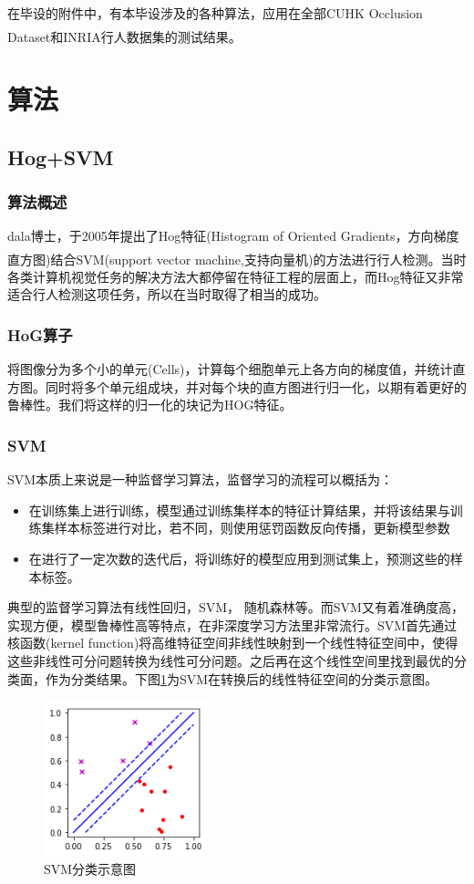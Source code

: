 \documentclass[12pt,a4paper,titlepage]{article}
\newcommand{\upcite}[1]{\textsuperscript{\textsuperscript{\cite{#1}}}}  %
\begin{document}
在毕设的附件中，有本毕设涉及的各种算法，应用在全部CUHK Occlusion Dataset和INRIA\upcite{dalal2005histograms}行人数据集的测试结果。

\section{算法}
\subsection{Hog+SVM}
\subsubsection{算法概述}
dala博士，于2005年提出了Hog特征(Histogram of Oriented Gradients，方向梯度直方图)结合SVM(support vector machine,支持向量机)的方法进行行人检测\upcite{dalal2005histograms}。当时各类计算机视觉任务的解决方法大都停留在特征工程的层面上，而Hog特征又非常适合行人检测这项任务，所以在当时取得了相当的成功。
\subsubsection{HoG算子}
将图像分为多个小的单元(Cells)，计算每个细胞单元上各方向的梯度值，并统计直方图。同时将多个单元组成块，并对每个块的直方图进行归一化，以期有着更好的鲁棒性。我们将这样的归一化的块记为HOG特征。
\subsubsection{SVM}
SVM本质上来说是一种监督学习算法，监督学习的流程可以概括为：
\begin{itemize}
\item 在训练集上进行训练，模型通过训练集样本的特征计算结果，并将该结果与训练集样本标签进行对比，若不同，则使用惩罚函数反向传播，更新模型参数
\item 在进行了一定次数的迭代后，将训练好的模型应用到测试集上，预测这些的样本标签。
\end{itemize}
典型的监督学习算法有线性回归，SVM， 随机森林等。而SVM又有着准确度高，实现方便，模型鲁棒性高等特点，在非深度学习方法里非常流行。SVM首先通过核函数(kernel function)将高维特征空间非线性映射到一个线性特征空间中，使得这些非线性可分问题转换为线性可分问题。之后再在这个线性空间里找到最优的分类面，作为分类结果。下图\ref{fig:svmClassify}为SVM在转换后的线性特征空间的分类示意图。

\begin{figure}[h]
\centering
\includegraphics[height=4.5cm]{img/svmInstance.png}
\caption{SVM分类示意图}
\label{fig:svmClassify}
\end{figure}
\end{document}
